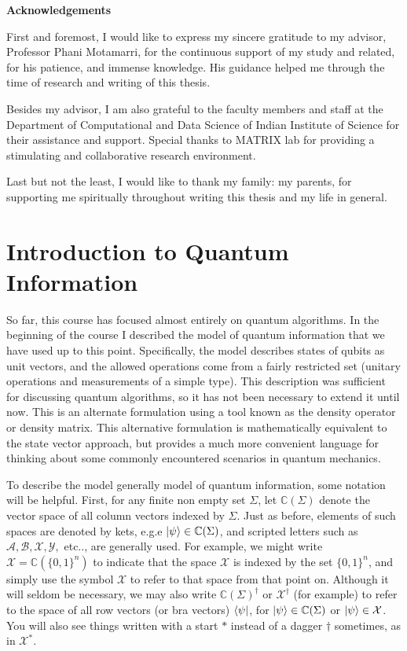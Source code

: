 \documentclass[12pt, oneside]{book}
\theoremstyle{definition}
\theoremstyle{definition}
\theoremstyle{remark}
\newcommand{\acknowledgementsname}{Acknowledgements}
\newenvironment{Acknowledgements}{%
\clearpage
\null\vfill
\begin{center}%
    \bfseries \acknowledgementsname
\end{center}}%
{\vfill\null}
\begin{document}
\begin{Acknowledgements}
First and foremost, I would like to express my sincere gratitude to my advisor,
Professor Phani Motamarri, for the continuous support of my study and related, for
his patience, and immense knowledge.
His guidance helped me through the time of research and writing of this thesis.

Besides my advisor, I am also grateful to the faculty members and staff at the
Department of Computational and Data Science of Indian Institute of Science for
their assistance and support. Special thanks to MATRIX lab for providing a stimulating
and collaborative research environment.

Last but not the least, I would like to thank my family: my parents,
for supporting me spiritually throughout writing this thesis and my life in general.
\end{Acknowledgements}

\tableofcontents
\mainmatter
\chapter{Introduction to Quantum Information}
So far, this course has focused almost entirely on quantum algorithms. In the beginning of the course I described the model of quantum information that we have used up to this point. Specifically, the model describes states of qubits as unit vectors, and the allowed operations come from a fairly restricted set (unitary operations and measurements of a simple type). This description was sufficient for discussing quantum algorithms, so it has not been necessary to extend it until now. This is an alternate formulation using a tool known as the density operator or density matrix. This alternative formulation is mathematically equivalent to the state vector approach, but provides a much more convenient language for thinking about some commonly encountered scenarios in quantum mechanics.

To describe the model generally model of quantum information, some notation will be helpful. First, for any finite non empty set $\Sigma$, let $\mathbb{C}(\Sigma)$ denote the vector space of all column vectors indexed by $\Sigma$. Just as before, elements of such spaces are denoted by kets, e.g.e $\ket{\psi} \in \mathbb{C}(\Sigma)$, and scripted letters such as $\mathcal{A},\mathcal{B},\mathcal{X},\mathcal{Y},$ etc.., are generally used. For example, we might write $\mathcal{X}=\mathbb{C}(\{0,1\}^n)$ to indicate that the space $\mathcal{X}$ is indexed by the set $\{0,1\}^n$, and simply use the symbol $\mathcal{X}$ to refer to that space from that point on. Although it will seldom be necessary, we may also write $\mathbb{C}(\Sigma)^{\dagger}$ or $\mathcal{X}^{\dagger}$ (for example) to refer to the space of all row vectors (or bra vectors) $\bra{\psi}$, for $\ket{\psi} \in \mathbb{C}(\Sigma)$ or $\ket{\psi} \in \mathcal{X}$. You will also see things written with a  start $*$ instead of a dagger $\dagger$ sometimes, as in $\mathcal{X}^*$.
\end{document}
